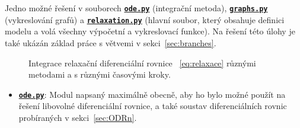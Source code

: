 \documentclass[a4paper,11pt,twoside]{article}
\def\ghfile#1#2{\textnormal{\textbf{\texttt{\href{https://github.com/PavelStransky/PCInPhysics/blob/main/#1#2}{#2}}}}}
\theoremstyle{red}
\theoremstyle{green}
\begin{document}
\setcounter{solution}{1}
\begin{solution}
    \label{sol:ODR1}
    Jedno možné řešení v souborech \ghfile{python/ode/}{ode.py} (integrační metoda), \ghfile{python/ode/}{graphs.py} (vykreslování grafů) a \ghfile{python/ode/}{relaxation.py} (hlavní soubor, který obsahuje definici modelu a volá všechny výpočetní a vykreslovací funkce).
    Na řešení této úlohy je také ukázán základ práce s větvemi v sekci~\ref{sec:branches}.
    
    \begin{figure}[!htbp]
        \begin{subfigure}{0.49\linewidth}
            \centering{}
        \end{subfigure}
        \hfill
        \begin{subfigure}{0.49\linewidth}
            \centering{}
        \end{subfigure}
        \begin{subfigure}{0.49\linewidth}
            \centering{}
        \end{subfigure}
        \hfill
        \begin{subfigure}{0.49\linewidth}
            \centering{}
        \end{subfigure}
        \caption{
            \protect\small
            Integrace relaxační diferenciální rovnice ~\eqref{eq:relaxace} různými metodami a s různými časovými kroky.
        }	
        \label{fig:relaxace}
    \end{figure}

    \begin{itemize}
    \item \ghfile{python/ode/}{ode.py}: 
        Modul napsaný maximálně obecně, aby ho bylo možné použít na řešení libovolné diferenciální rovnice, a také soustav diferenciálních rovnic probíraných v sekci~\ref{sec:ODRn}.
        

\end{itemize}
\end{solution}
\end{document}
